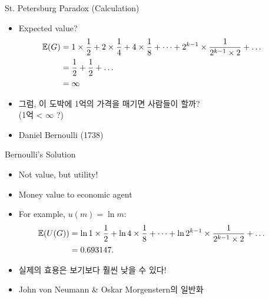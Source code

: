 \documentclass[final]{beamer}
\begin{document}
\begin{frame}[t]{St. Petersburg Paradox (Calculation)}
	\begin{itemize}
	\item Expected value? 
	\begin{align*}
	\hspace{-2em}\mathbb{E}(G)&= 1 \times \frac{1}{2} + 2 \times \frac{1}{4} + 4 \times \frac{1}{8} + \cdots + 2^{k-1} \times \frac{1}{2^{k-1} \times 2} + \ldots \\
	& = \frac{1}{2} + \frac{1}{2} + \ldots \\
	& = \infty
	\end{align*}
	\item 그럼, 이 도박에 1억의 가격을 매기면 사람들이 할까? \\
	(1억 < $\infty$ ?)
	\item Daniel Bernoulli (1738) 
	\end{itemize}
\end{frame}

\begin{frame}[t]{Bernoulli's Solution}
	\begin{itemize}
	\item Not value, but utility!
	\item Money value to economic agent
	\item For example, $u(m)=\ln{m}$: 
	\begin{align*}
	\hspace{-2em}\mathbb{E}(U(G))&= \ln{1} \times \frac{1}{2} + \ln{4} \times \frac{1}{8} + \cdots + \ln{2^{k-1}} \times \frac{1}{2^{k-1} \times 2} + \ldots \\
	& = 0.693147.
	\end{align*}
	\item 실제의 효용은 보기보다 훨씬 낮을 수 있다! 
	\item John von Neumann {\&} Oskar Morgenstern의 일반화
	\end{itemize}
\end{frame}
\end{document}
